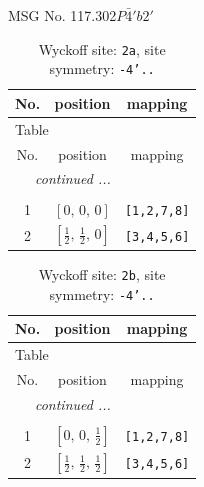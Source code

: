 \documentclass[fleqn,8pt]{jsarticle}
\begin{document}
\setcounter{MaxMatrixCols}{32}

\renewcommand{\tablename}{Table~}
\renewcommand{\figurename}{Figure~}
\begin{center}
\LARGE
MSG No. 117.302\quad$P\bar{4}'b2'$
\end{center}
\renewcommand{\arraystretch}{1.2}
\begin{longtable}{ccc}
\caption{Wyckoff site: {\tt 2a}, site symmetry: {\tt -4'..}}
 \\
 \hline \hline
No. & position & mapping \\ \hline \endfirsthead

\multicolumn{2}{l}{\tablename\ \thetable{}} \\
 \hline \hline
No. & position & mapping \\ \hline \endhead

 \hline \hline
\multicolumn{2}{r}{\footnotesize\it continued ...} \\ \endfoot

 \hline \hline
\multicolumn{2}{r}{} \\ \endlastfoot

1 & $\left[ 0,\, 0,\, 0 \right]$ & {\tt [1,2,7,8]} \\ \hline
2 & $\left[ \frac{1}{2},\, \frac{1}{2},\, 0 \right]$ & {\tt [3,4,5,6]} \\
\end{longtable}
\renewcommand{\arraystretch}{1.2}
\begin{longtable}{ccc}
\caption{Wyckoff site: {\tt 2b}, site symmetry: {\tt -4'..}}
 \\
 \hline \hline
No. & position & mapping \\ \hline \endfirsthead

\multicolumn{2}{l}{\tablename\ \thetable{}} \\
 \hline \hline
No. & position & mapping \\ \hline \endhead

 \hline \hline
\multicolumn{2}{r}{\footnotesize\it continued ...} \\ \endfoot

 \hline \hline
\multicolumn{2}{r}{} \\ \endlastfoot

1 & $\left[ 0,\, 0,\, \frac{1}{2} \right]$ & {\tt [1,2,7,8]} \\ \hline
2 & $\left[ \frac{1}{2},\, \frac{1}{2},\, \frac{1}{2} \right]$ & {\tt [3,4,5,6]} \\
\end{longtable}
\end{document}
